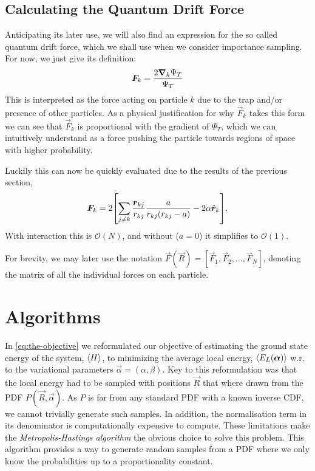 \documentclass[twocolumn]{article}
\begin{document}
\subsection{Calculating the Quantum Drift Force}
Anticipating its later use, we will also find an expression for the so called
quantum drift force, which we shall use when we consider importance sampling.
For now, we just give its definition:
\begin{align}
    \bm F_k = \frac{2\grad_k\Psi_T}{\Psi_T}\label{eq:Q-force-def}
\end{align}
This is interpreted as the force acting on particle $k$ due to the trap and/or
presence of other particles. As a physical justification for why $\vec F_k$
takes this form we can see that $\vec F_k$ is
proportional with the gradient of $\Psi_T$, which we can intuitively understand
as a force pushing the particle towards regions of space with higher
probability. 

Luckily this can now be quickly evaluated due to
the results of the previous section,
\begin{align}
    \bm F_k = 2\qty[\sum_{j\neq k}\frac{\bm r_{kj}}{r_{kj}}
    \frac{a}{r_{kj}(r_{kj}-a)} - 2\alpha\hat{\bm
    r}_k].\label{eq:Q-force-explicit}
\end{align}
With interaction this is $\mathcal{O}(N)$, and without ($a=0$) it simplifies to $\mathcal{O}(1)$.

For brevity, we may later use the notation $\vec F(\vec R) = [\vec F_1, \vec
F_2,\dots,\vec F_N]$, denoting the matrix of all the individual forces on each
particle.


\section{Algorithms}
In \eqref{eq:the-objective} we reformulated our objective of estimating the ground state energy of the
system, $\expval{H}$, to minimizing the average local energy, $\expval{E_L(\bm\alpha)}$ w.r. to
the variational parameters $\vec \alpha = (\alpha, \beta)$. Key to this
reformulation was that the local energy had to be sampled with positions $\vec
R$ that where drawn from the PDF $P(\vec R, \vec\alpha)$. As $P$ is far from any
standard PDF with a known inverse CDF, we cannot trivially generate such
samples. In addition, the normalisation term in its denominator is
computationally expensive to compute. These limitations make the
\textit{Metropolis-Hastings algorithm} the obvious choice to solve this problem. This
algorithm provides a way to generate random samples from a PDF where we only
know the probabilities up to a proportionality constant.
\end{document}
